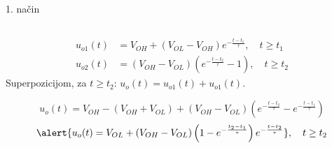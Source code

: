 \begin{frame}[label=08-s059]{1. način}
\setlength{\parskip}{2pt}\setlength{\abovedisplayskip}{4pt}\setlength{\belowdisplayskip}{4pt}
\begin{columns}[c,onlytextwidth]
\centering
{}\centering
{}\centering
\end{columns}\smallskip
\begin{align*}
u_{o1}(t)&=V_{OH}+(V_{OL}-V_{OH})e^{-\frac{t-t_1}{\tau}},\quad t\geq t_1\\
u_{o2}(t)&=(V_{OH}-V_{OL})\left(e^{-\frac{t-t_2}{\tau}}-1\right),\quad t\geq t_2
\end{align*}
Superpozicijom, za $t\geq t_2$: $u_o(t)=u_{o1}(t)+u_{o1}(t)$.\par
\[u_o(t)=V_{OH}-(V_{OH}+V_{OL})+(V_{OH}-V_{OL})\left(e^{-\frac{t-t_2}{\tau}}-e^{-\frac{t-t_1}{\tau}}\right)\]
\[\alert{u_o(t)=V_{OL}+(V_{OH}-V_{OL})\left(1-e^{-\frac{t_2-t_1}{\tau}}\right)e^{-\frac{t-t_2}{\tau}}},\quad t\geq t_2\]
\end{frame}
